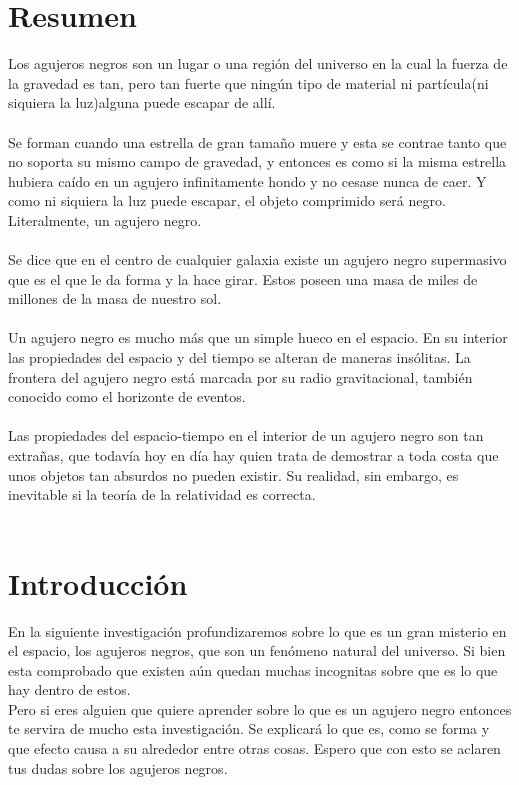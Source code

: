 \documentclass[12pt]{article}
\begin{document}
\section{Resumen}
Los agujeros negros son un lugar o una región del universo en la cual la fuerza de la gravedad es tan, pero tan fuerte que ningún tipo de material ni partícula(ni siquiera la luz)alguna puede escapar de allí.\\\\
Se forman cuando una estrella de gran tamaño muere y esta se contrae tanto que no soporta su mismo campo de gravedad, y entonces es como si la misma estrella hubiera caído en un agujero infinitamente hondo y no cesase nunca de caer. Y como ni siquiera la luz puede escapar, el objeto comprimido será negro. Literalmente, un agujero negro.
\\\\
Se dice que en el centro de cualquier galaxia existe un agujero negro supermasivo que es el que le da forma y la hace girar. Estos poseen una masa de miles de millones de la masa de nuestro sol.
\\\\
Un agujero negro es mucho más que un simple hueco en el espacio. En su interior las propiedades del espacio y del tiempo se alteran de maneras insólitas. La frontera del agujero negro está marcada por su radio gravitacional, también conocido como el horizonte de eventos.\\\\
Las propiedades del espacio-tiempo en el interior de un agujero negro son tan extrañas, que todavía hoy en día hay quien trata de demostrar a toda costa que unos objetos tan absurdos no pueden existir. Su realidad, sin embargo, es inevitable si la teoría de la relatividad es correcta.\\\\
\newpage

\section{Introducción}
En la siguiente investigación profundizaremos sobre lo que es un gran misterio en el espacio, los agujeros negros, que son un fenómeno natural del universo. Si bien esta comprobado que existen aún quedan muchas incognitas sobre que es lo que hay dentro de estos.\\ Pero si eres alguien que quiere aprender sobre lo que es un agujero negro entonces te servira de mucho esta investigación. Se explicará lo que es, como se forma y que efecto causa a su alrededor entre otras cosas. Espero que con esto se aclaren tus dudas sobre los agujeros negros.
\newpage
\end{document}
